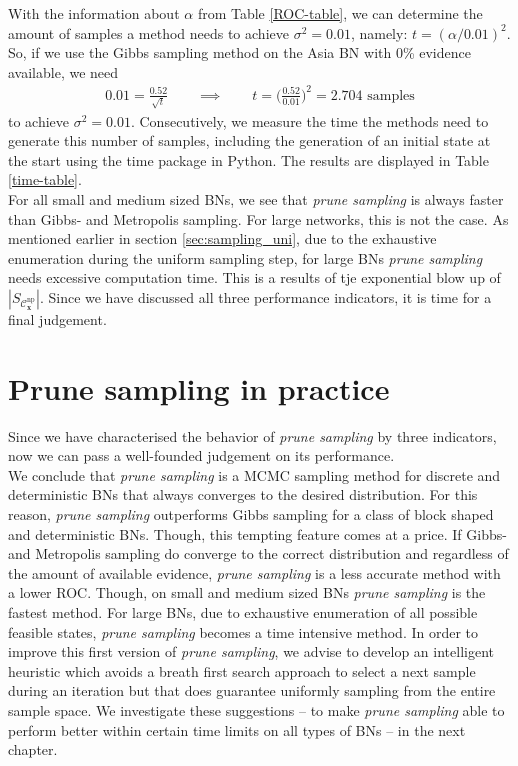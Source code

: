 \documentclass[a4paper, twoside, 11pt]{report}
\newcommand{\bfx}{{\mathbf{x}}}
\newcommand{\C}{{\mathcal C}}
\theoremstyle{plain}
\theoremstyle{definition}
\theoremstyle{remark}
\newcommand{\ps}{\textit{prune sampling }}
\begin{document}
With the information about $\alpha$ from Table \ref{ROC-table}, we can determine the amount of samples a method needs to achieve $\sigma^2 = 0.01$, namely: $t = (\alpha / 0.01)^{2}$. So, if we use the Gibbs sampling method on the Asia BN with 0\% evidence available, we need
\begin{align*}
0.01= \frac{0.52}{\sqrt{t}} \qquad \implies \qquad t = \bigg( \frac{0.52}{0.01} \bigg)^2 = 2.704 \text{ samples}
\end{align*}
to achieve $\sigma^2 = 0.01$. Consecutively, we measure the time the methods need to generate this number of samples, including the generation of an initial state at the start using the time package in Python. The results are displayed in Table \ref{time-table}.\\

For all small and medium sized BNs, we see that \ps is always faster than Gibbs- and Metropolis sampling. For large networks, this is not the case. As mentioned earlier in section \ref{sec:sampling_uni}, due to the exhaustive enumeration during the uniform sampling step, for large BNs \ps needs excessive computation time. This is a results of tje exponential blow up of $|S_{\C_\bfx^{\text{np}}}|$. Since we have discussed all three performance indicators, it is time for a final judgement.

\section{Prune sampling in practice}
Since we have characterised the behavior of \textit{prune sampling} by three indicators, now we can pass a well-founded judgement on its performance. \\

We conclude that \ps is a MCMC sampling method for discrete and deterministic BNs that always converges to the desired distribution. For this reason, \ps outperforms Gibbs sampling for a class of block shaped and deterministic BNs. Though, this tempting feature comes at a price. If Gibbs- and Metropolis sampling do converge to the correct distribution and regardless of the amount of available evidence, \ps is a less accurate method with a lower ROC. Though, on small and medium sized BNs \ps is the fastest method. For large BNs, due to exhaustive enumeration of all possible feasible states, \ps becomes a time intensive method. In order to improve this first version of \textit{prune sampling}, we advise to develop an intelligent heuristic which avoids a breath first search approach to select a next sample during an iteration but that does guarantee uniformly sampling from the entire sample space. We investigate these suggestions -- to make \ps able to perform better within certain time limits on all types of BNs -- in the next chapter.
\end{document}
